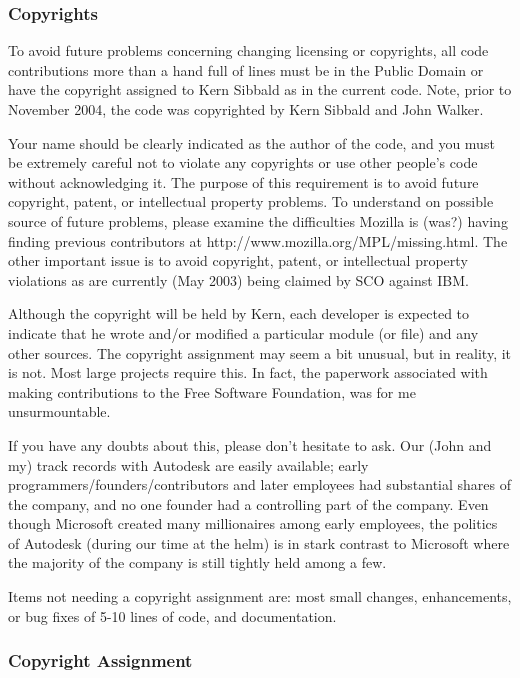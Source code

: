 \subsubsection*{Copyrights}

To avoid future problems concerning changing licensing or copyrights, all code
contributions more than a hand full of lines must be in the Public Domain or
have the copyright assigned to Kern Sibbald as in the current code. Note,
prior to November 2004, the code was copyrighted by Kern Sibbald and John
Walker. 

Your name should be clearly indicated as the author of the code, and you must
be extremely careful not to violate any copyrights or use other people's code
without acknowledging it. The purpose of this requirement is to avoid future
copyright, patent, or intellectual property problems. To understand on
possible source of future problems, please examine the difficulties Mozilla is
(was?) having finding previous contributors at 
{http://www.mozilla.org/MPL/missing.html}. The other important issue is to
avoid copyright, patent, or intellectual property violations as are currently
(May 2003) being claimed by SCO against IBM. 

Although the copyright will be held by Kern, each developer is expected to
indicate that he wrote and/or modified a particular module (or file) and any
other sources. The copyright assignment may seem a bit unusual, but in
reality, it is not. Most large projects require this. In fact, the paperwork
associated with making contributions to the Free Software Foundation, was for
me unsurmountable. 

If you have any doubts about this, please don't hesitate to ask. Our (John and
my) track records with Autodesk are easily available; early
programmers/founders/contributors and later employees had substantial shares
of the company, and no one founder had a controlling part of the company. Even
though Microsoft created many millionaires among early employees, the politics
of Autodesk (during our time at the helm) is in stark contrast to Microsoft
where the majority of the company is still tightly held among a few. 

Items not needing a copyright assignment are: most small changes,
enhancements, or bug fixes of 5-10 lines of code, and documentation. 

\subsubsection*{Copyright Assignment}

